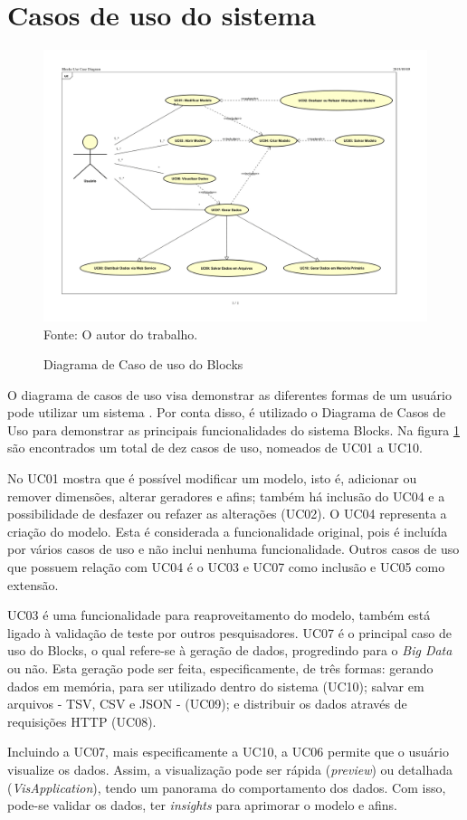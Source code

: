 \documentclass[
	12pt,				%
	openright,			%
	oneside,			%
	a4paper,			%
	english,			%
	brazil				%
	]{abntex2}
\begin{document}
	\section{Casos de uso do sistema}
		\begin{figure}[h!]
			\centering
			\caption{Diagrama de Caso de uso do Blocks}
			\includegraphics[width=\linewidth]{./figures/prototipo/diagramaUC.png}
			\label{fig:diagramaUC}
			\footnotesize Fonte: O autor do trabalho.
		\end{figure}
		O diagrama de casos de uso visa demonstrar as diferentes formas de um usuário pode utilizar um sistema \cite{UCdefinition}.
		Por conta disso, é utilizado o Diagrama de Casos de Uso para demonstrar as principais funcionalidades do sistema Blocks.
		Na figura \ref{fig:diagramaUC} são encontrados um total de dez casos de uso, nomeados de UC01 a UC10.
		\par
		No UC01 mostra que é possível modificar um modelo, isto é, adicionar ou remover dimensões, alterar geradores e afins; também há inclusão do UC04 e a possibilidade de desfazer ou refazer as alterações (UC02).
		O UC04 representa a criação do modelo. 
		Esta é considerada a funcionalidade original, pois é incluída por vários casos de uso e não inclui nenhuma funcionalidade.
		Outros casos de uso que possuem relação com UC04 é o UC03 e UC07 como inclusão e UC05 como extensão.
		\par
		UC03 é uma funcionalidade para reaproveitamento do modelo, também está ligado à validação de teste por outros pesquisadores.
		UC07 é o principal caso de uso do Blocks, o qual refere-se à geração de dados, progredindo para o \emph{Big Data} ou não.
		Esta geração pode ser feita, especificamente, de três formas: gerando dados em memória, para ser utilizado dentro do sistema (UC10);
			salvar em arquivos - TSV, CSV e JSON - (UC09);
			e distribuir os dados através de requisições HTTP (UC08).
		\par
		Incluindo a UC07, mais especificamente a UC10, a UC06 permite que o usuário visualize os dados. 
		Assim, a visualização pode ser rápida (\emph{preview}) ou detalhada (\emph{VisApplication}), tendo um panorama do comportamento dos dados. 
		Com isso, pode-se validar os dados, ter \emph{insights} para aprimorar o modelo e afins.
\end{document}
